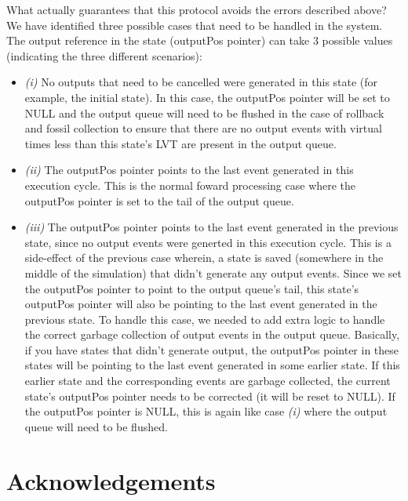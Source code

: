 \documentclass[11pt]{report}
\begin{document}
What actually guarantees that this protocol avoids the errors described
above? We have identified three possible cases that need to be handled in 
the system. The output reference in the state (outputPos pointer) can take 
3 possible values (indicating the three different scenarios):

\begin{itemize}

\item \emph{(i)} No outputs that need to be cancelled were generated in
  this state (for example, the initial state). In this case, the outputPos
  pointer will be set to NULL and the output queue will need to be flushed
  in the case of rollback and fossil collection to ensure that there are
  no output events with virtual times less than this state's LVT are
  present in the output queue.

\item \emph{(ii)} The outputPos pointer points to the last event generated
  in this execution cycle. This is the normal foward processing case where
  the outputPos pointer is set to the tail of the output queue.

\item \emph{(iii)} The outputPos pointer points to the last event
  generated in the previous state, since no output events were generted in
  this execution cycle. This is a side-effect of the previous case
  wherein, a state is saved (somewhere in the middle of the simulation)
  that didn't generate any output events. Since we set the outputPos
  pointer to point to the output queue's tail, this state's outputPos
  pointer will also be pointing to the last event generated in the
  previous state. To handle this case, we needed to add extra logic to
  handle the correct garbage collection of output events in the output 
  queue. Basically, if you have states that didn't generate output, the
  outputPos pointer in these states will be pointing to the last event 
  generated in some earlier state. If this earlier state and the
  corresponding events are garbage collected, the current state's
  outputPos pointer needs to be corrected (it will be reset to
  NULL). If the outputPos pointer is NULL, this is again like case
  \emph{(i)} where the output queue will need to be flushed.

\end{itemize}

\chapter*{Acknowledgements}
\end{document}

